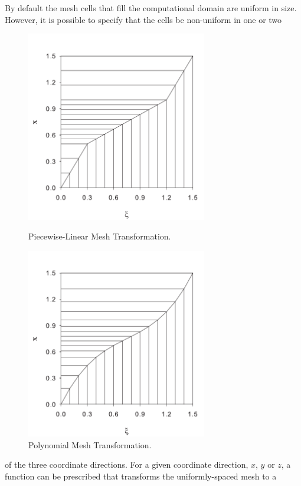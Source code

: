 \documentclass[11pt]{book}
\begin{document}
By default the mesh cells that fill the computational domain are uniform in size.
However, it is possible to specify that the cells be non-uniform in one or two
\begin{figure}[ht]
\begin{minipage}[t]{3.1in}
\includegraphics[width=3.1in]{FIGURES/piece_wise_linear}
\vspace{-.2in}
\caption{Piecewise-Linear Mesh Transformation.}
\label{fig:grid2}
\end{minipage}
\hfill
\begin{minipage}[t]{3.1in}
\includegraphics[width=3.1in]{FIGURES/polygonal}
\vspace{-.2in}
\caption{Polynomial Mesh Transformation.}
\label{fig:grid1}
\end{minipage}
\end{figure}
of the three coordinate directions.
For a given coordinate direction, $x$, $y$ or $z$, a function can be
prescribed that transforms the uniformly-spaced mesh to a
\end{document}
